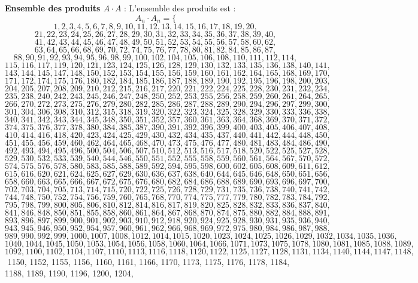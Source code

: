 \documentclass[11pt,a4paper]{article}
\begin{document}
\textbf{Ensemble des produits $A \cdot A$} :
L'ensemble des produits est :
$$ A_{{{n}}} \cdot A_{{{n}}} = \{ $$$$ 1, 2, 3, 4, 5, 6, 7, 8, 9, 10, 11, 12, 13, 14, 15, 16, 17, 18, 19, 20, $$$$ 21, 22, 23, 24, 25, 26, 27, 28, 29, 30, 31, 32, 33, 34, 35, 36, 37, 38, 39, 40, $$$$ 41, 42, 43, 44, 45, 46, 47, 48, 49, 50, 51, 52, 53, 54, 55, 56, 57, 58, 60, 62, $$$$ 63, 64, 65, 66, 68, 69, 70, 72, 74, 75, 76, 77, 78, 80, 81, 82, 84, 85, 86, 87, $$$$ 88, 90, 91, 92, 93, 94, 95, 96, 98, 99, 100, 102, 104, 105, 106, 108, 110, 111, 112, 114, $$$$ 115, 116, 117, 119, 120, 121, 123, 124, 125, 126, 128, 129, 130, 132, 133, 135, 136, 138, 140, 141, $$$$ 143, 144, 145, 147, 148, 150, 152, 153, 154, 155, 156, 159, 160, 161, 162, 164, 165, 168, 169, 170, $$$$ 171, 172, 174, 175, 176, 180, 182, 184, 185, 186, 187, 188, 189, 190, 192, 195, 196, 198, 200, 203, $$$$ 204, 205, 207, 208, 209, 210, 212, 215, 216, 217, 220, 221, 222, 224, 225, 228, 230, 231, 232, 234, $$$$ 235, 238, 240, 242, 243, 245, 246, 247, 248, 250, 252, 253, 255, 256, 258, 259, 260, 261, 264, 265, $$$$ 266, 270, 272, 273, 275, 276, 279, 280, 282, 285, 286, 287, 288, 289, 290, 294, 296, 297, 299, 300, $$$$ 301, 304, 306, 308, 310, 312, 315, 318, 319, 320, 322, 323, 324, 325, 328, 329, 330, 333, 336, 338, $$$$ 340, 341, 342, 343, 344, 345, 348, 350, 351, 352, 357, 360, 361, 363, 364, 368, 369, 370, 371, 372, $$$$ 374, 375, 376, 377, 378, 380, 384, 385, 387, 390, 391, 392, 396, 399, 400, 403, 405, 406, 407, 408, $$$$ 410, 414, 416, 418, 420, 423, 424, 425, 429, 430, 432, 434, 435, 437, 440, 441, 442, 444, 448, 450, $$$$ 451, 455, 456, 459, 460, 462, 464, 465, 468, 470, 473, 475, 476, 477, 480, 481, 483, 484, 486, 490, $$$$ 492, 493, 494, 495, 496, 500, 504, 506, 507, 510, 512, 513, 516, 517, 518, 520, 522, 525, 527, 528, $$$$ 529, 530, 532, 533, 539, 540, 544, 546, 550, 551, 552, 555, 558, 559, 560, 561, 564, 567, 570, 572, $$$$ 574, 575, 576, 578, 580, 583, 585, 588, 589, 592, 594, 595, 598, 600, 602, 605, 608, 609, 611, 612, $$$$ 615, 616, 620, 621, 624, 625, 627, 629, 630, 636, 637, 638, 640, 644, 645, 646, 648, 650, 651, 656, $$$$ 658, 660, 663, 665, 666, 667, 672, 675, 676, 680, 682, 684, 686, 688, 689, 690, 693, 696, 697, 700, $$$$ 702, 703, 704, 705, 713, 714, 715, 720, 722, 725, 726, 728, 729, 731, 735, 736, 738, 740, 741, 742, $$$$ 744, 748, 750, 752, 754, 756, 759, 760, 765, 768, 770, 774, 775, 777, 779, 780, 782, 783, 784, 792, $$$$ 795, 798, 799, 800, 805, 806, 810, 812, 814, 816, 817, 819, 820, 825, 828, 832, 833, 836, 837, 840, $$$$ 841, 846, 848, 850, 851, 855, 858, 860, 861, 864, 867, 868, 870, 874, 875, 880, 882, 884, 888, 891, $$$$ 893, 896, 897, 899, 900, 901, 902, 903, 910, 912, 918, 920, 924, 925, 928, 930, 931, 935, 936, 940, $$$$ 943, 945, 946, 950, 952, 954, 957, 960, 961, 962, 966, 968, 969, 972, 975, 980, 984, 986, 987, 988, $$$$ 989, 990, 992, 999, 1000, 1007, 1008, 1012, 1014, 1015, 1020, 1023, 1024, 1025, 1026, 1029, 1032, 1034, 1035, 1036, $$$$ 1040, 1044, 1045, 1050, 1053, 1054, 1056, 1058, 1060, 1064, 1066, 1071, 1073, 1075, 1078, 1080, 1081, 1085, 1088, 1089, $$$$ 1092, 1100, 1102, 1104, 1107, 1110, 1113, 1116, 1118, 1120, 1122, 1125, 1127, 1128, 1131, 1134, 1140, 1144, 1147, 1148, $$$$ 1150, 1152, 1155, 1156, 1160, 1161, 1166, 1170, 1173, 1175, 1176, 1178, 1184, 1188, 1189, 1190, 1196, 1200, 1204, 
\end{document}
